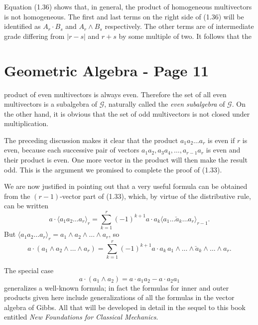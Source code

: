 \documentclass[fleqn]{scrartcl}
\numberwithin{equation}{section}
\begin{document}
\noindent Equation (1.36) shows that, in general, the product of homogeneous multivectors is not homogeneous. The first and last terms on the right side of (1.36) will be identified as \(A_r \cdot B_s\) and \(A_r \wedge B_s\) respectively. The other terms are of intermediate grade differing from \(|r-s|\) and \(r+s\) by some multiple of two. It follows that the

\section*{Geometric Algebra - Page 11}

\noindent product of even multivectors is always even. Therefore the set of all even multivectors is a subalgebra of \(\mathscr{G}\), naturally called the \textit{even subalgebra} of \(\mathscr{G}\). On the other hand, it is obvious that the set of odd multivectors is not closed under multiplication.

\vspace{1em}
\noindent The preceding discussion makes it clear that the product \(a_1 a_2 \dots a_r\) is even if \(r\) is even, because each successive pair of vectors \(a_1 a_2, a_3 a_4, \dots, a_{r-1} a_r\) is even and their product is even. One more vector in the product will then make the result odd. This is the argument we promised to complete the proof of (1.33).

\vspace{1em}
\noindent We are now justified in pointing out that a very useful formula can be obtained from the \((r-1)\)-vector part of (1.33), which, by virtue of the distributive rule, can be written
\[
a \cdot \langle a_1 a_2 \dots a_r \rangle_r = \sum_{k=1}^r (-1)^{k+1} a \cdot a_k \langle a_1 \dots \breve{a}_k \dots a_r \rangle_{r-1}.
\]
But \(\langle a_1 a_2 \dots a_r \rangle_r = a_1 \wedge a_2 \wedge \dots \wedge a_r\), so
\begin{equation}
a \cdot (a_1 \wedge a_2 \wedge \dots \wedge a_r) = \sum_{k=1}^r (-1)^{k+1} a \cdot a_k \, a_1 \wedge \dots \wedge \breve{a}_k \wedge \dots \wedge a_r. \tag{1.38}
\end{equation}

\vspace{1em}
\noindent The special case
\begin{equation}
a \cdot (a_1 \wedge a_2) = a \cdot a_1 a_2 - a \cdot a_2 a_1 \tag{1.39}
\end{equation}
generalizes a well-known formula; in fact the formulas for inner and outer products given here include generalizations of all the formulas in the vector algebra of Gibbs. All that will be developed in detail in the sequel to this book entitled \textit{New Foundations for Classical Mechanics}.
\end{document}
